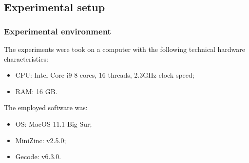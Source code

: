 \documentclass[../main.tex]{subfiles}
\begin{document}
\subsection{Experimental setup}
\subsubsection{Experimental environment}
The experiments were took on a computer with the following technical hardware characteristics:
\begin{itemize}
    \item CPU: Intel Core i9 8 cores, 16 threads, 2.3GHz clock speed;
    \item RAM: 16 GB.
\end{itemize}
The employed software was:
\begin{itemize}
    \item OS: MacOS 11.1 Big Sur;
    \item MiniZinc: v2.5.0;
    \item Gecode: v6.3.0.
\end{itemize}
\end{document}
